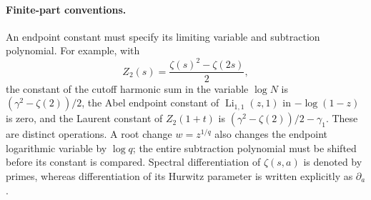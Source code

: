 \paragraph{Finite-part conventions.}
An endpoint constant must specify its limiting variable and subtraction
polynomial. For example, with
\[
 Z_2(s)=\frac{\zeta(s)^2-\zeta(2s)}{2},
\]
the constant of the cutoff harmonic sum in the variable $\log N$ is
$(\gamma^2-\zeta(2))/2$, the Abel endpoint constant of
$\operatorname{Li}_{1,1}(z,1)$ in $-\log(1-z)$ is zero, and the Laurent
constant of $Z_2(1+t)$ is
$(\gamma^2-\zeta(2))/2-\gamma_1$. These are distinct operations.
A root change $w=z^{1/q}$ also changes the endpoint logarithmic variable
by $\log q$; the entire subtraction polynomial must be shifted before its
constant is compared. Spectral differentiation of $\zeta(s,a)$ is denoted
by primes, whereas differentiation of its Hurwitz parameter is written
explicitly as $\partial_a$.
